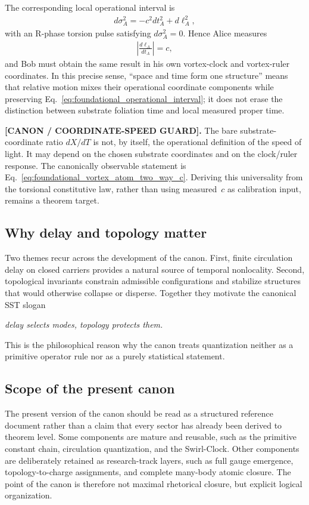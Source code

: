 \documentclass[11pt]{article}
\theoremstyle{definition}
\theoremstyle{plain}
\theoremstyle{remark}
\begin{document}
        The corresponding local operational interval is
        \begin{align}
            d\sigma_A^2
            =
            -c^2dt_A^2+d\ell_A^2,
            \label{eq:foundational_operational_interval}
        \end{align}
        with an R-phase torsion pulse satisfying \(d\sigma_A^2=0\). Hence Alice measures
        \begin{align}
            \left|\frac{d\ell_A}{dt_A}\right|=c,
        \end{align}
        and Bob must obtain the same result in his own vortex-clock and vortex-ruler coordinates. In this precise sense, ``space and time form one structure'' means that relative motion mixes their operational coordinate components while preserving Eq.~\eqref{eq:foundational_operational_interval}; it does not erase the distinction between substrate foliation time and local measured proper time.

        \textbf{[CANON / COORDINATE-SPEED GUARD].}
        The bare substrate-coordinate ratio \(dX/dT\) is not, by itself, the operational definition of the speed of light. It may depend on the chosen substrate coordinates and on the clock/ruler response. The canonically observable statement is Eq.~\eqref{eq:foundational_vortex_atom_two_way_c}. Deriving this universality from the torsional constitutive law, rather than using measured~\(c\) as calibration input, remains a theorem target.

    \subsection{Why delay and topology matter}
        Two themes recur across the development of the canon.
        First, finite circulation delay on closed carriers provides a natural source of temporal nonlocality. Second, topological invariants constrain admissible configurations and stabilize structures that would otherwise collapse or disperse. Together they motivate the canonical SST slogan
        \begin{center}
            \textit{delay selects modes, topology protects them.}
        \end{center}
        This is the philosophical reason why the canon treats quantization neither as a primitive operator rule nor as a purely statistical statement.

    \subsection{Scope of the present canon}
        The present version of the canon should be read as a structured reference document rather than a claim that every sector has already been derived to theorem level. Some components are mature and reusable, such as the primitive constant chain, circulation quantization, and the Swirl-Clock. Other components are deliberately retained as research-track layers, such as full gauge emergence, topology-to-charge assignments, and complete many-body atomic closure. The point of the canon is therefore not maximal rhetorical closure, but explicit logical organization.
\end{document}

